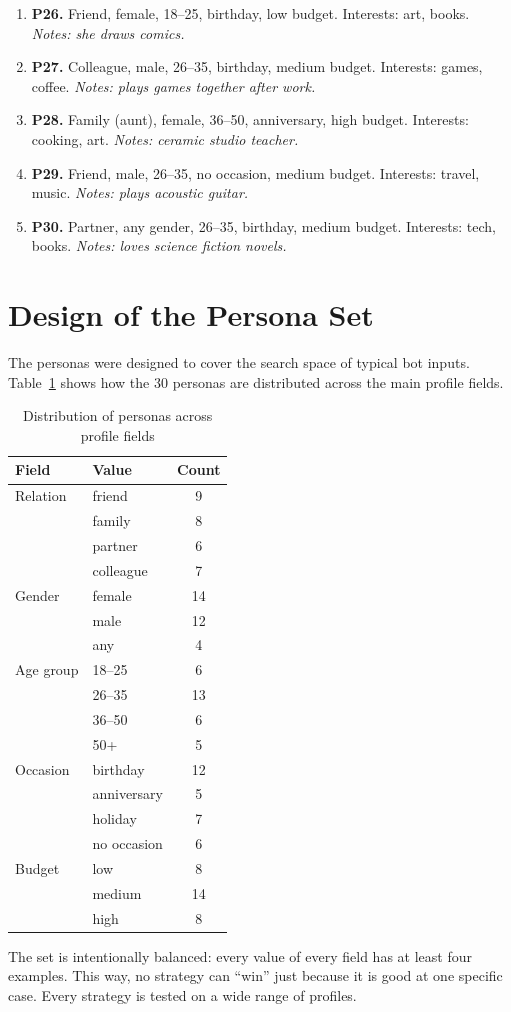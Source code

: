 \begin{enumerate}
    \item \textbf{P26.} Friend, female, 18--25, birthday, low budget. Interests: art, books. \textit{Notes: she draws comics.}
    \item \textbf{P27.} Colleague, male, 26--35, birthday, medium budget. Interests: games, coffee. \textit{Notes: plays games together after work.}
    \item \textbf{P28.} Family (aunt), female, 36--50, anniversary, high budget. Interests: cooking, art. \textit{Notes: ceramic studio teacher.}
    \item \textbf{P29.} Friend, male, 26--35, no occasion, medium budget. Interests: travel, music. \textit{Notes: plays acoustic guitar.}
    \item \textbf{P30.} Partner, any gender, 26--35, birthday, medium budget. Interests: tech, books. \textit{Notes: loves science fiction novels.}
\end{enumerate}

\section{Design of the Persona Set}

The personas were designed to cover the search space of typical bot inputs. Table~\ref{tab:persona-stats} shows how the 30 personas are distributed across the main profile fields.

\begin{table}[H]
\centering
\caption{Distribution of personas across profile fields}
\label{tab:persona-stats}
\begin{tabular}{llc}
\toprule
\textbf{Field} & \textbf{Value} & \textbf{Count} \\
\midrule
Relation & friend & 9 \\
         & family & 8 \\
         & partner & 6 \\
         & colleague & 7 \\
\midrule
Gender & female & 14 \\
       & male & 12 \\
       & any & 4 \\
\midrule
Age group & 18--25 & 6 \\
          & 26--35 & 13 \\
          & 36--50 & 6 \\
          & 50+ & 5 \\
\midrule
Occasion & birthday & 12 \\
         & anniversary & 5 \\
         & holiday & 7 \\
         & no occasion & 6 \\
\midrule
Budget & low & 8 \\
       & medium & 14 \\
       & high & 8 \\
\bottomrule
\end{tabular}
\end{table}
The set is intentionally balanced: every value of every field has at least four examples. This way, no strategy can ``win'' just because it is good at one specific case. Every strategy is tested on a wide range of profiles.

